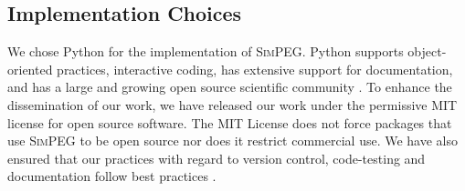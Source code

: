 \documentclass[preprint,review,3p,times,onecolumn,authoryear]{elsarticle}
\newcommand{\SimPEG}{\textsc{SimPEG}\xspace}
\begin{document}
\subsection{Implementation Choices}
We chose Python \citep{python} for the implementation
of \SimPEG. Python supports object-oriented practices, interactive
coding, has extensive support for documentation, and has a large and
growing open source scientific community \citep{Lin2012}.
To enhance the dissemination of our work, we have released our work under
the permissive MIT license for open source software.
The MIT License does not force packages that use \SimPEG to be open source
nor does it restrict commercial use. We have also ensured
that our practices with regard to version control, code-testing and documentation follow
best practices \citep{Wilson2014}.
\end{document}
